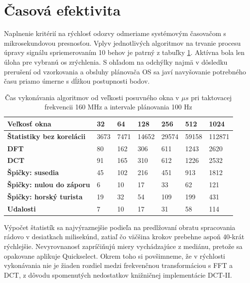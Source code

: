 \section{Časová efektivita}
Naplnenie kritérií na rýchlosť odozvy odmeriame systémovým časovačom s mikrosekundovou presnosťou.
Vplyv jednotlivých algoritmov na trvanie procesu úpravy signálu spriemerovaním 10 behov
je patrný z tabuľky \ref{tab:algorithm-execution}. Aktívna bola len úloha pre vybranú os zrýchlenia. S ohľadom na odchýlky
najmä v dôsledku prerušení od vzorkovania a obsluhy plánovača OS sa javí navyšovanie potrebného času priamo úmerne
s dĺžkou postupnosti bodov.
\begin{table}[h]
\def\arraystretch{1.25}
\centering
\begin{tabular}{|l|l|l|l|l|l|l|}
\hline
\textbf{Veľkosť okna}         & \textbf{32} & \textbf{64} & \textbf{128} & \textbf{256} & \textbf{512} & \textbf{1024} \\ \hline
\textbf{Štatistiky bez korelácii}& 3673        & 7471        & 14652        & 29574        & 59158        & 112871        \\ \hline
\textbf{DFT}                     & 80          & 162         & 306          & 611          & 1243         & 2620          \\ \hline
\textbf{DCT}                     & 91          & 165         & 310          & 612          & 1226         & 2532          \\ \hline
\textbf{Špičky: susedia}         & 45          & 102         & 216          & 451          & 913          & 1812          \\ \hline
\textbf{Špičky: nulou do záporu} & 6           & 10          & 17           & 33           & 62           & 121           \\ \hline
\textbf{Špičky: horský turista}  & 19          & 32          & 54           & 109          & 199          & 431           \\ \hline
\textbf{Udalosti}                & 7           & 10          & 17           & 31           & 58           & 114           \\ \hline
\end{tabular}
\caption{Čas vykonávania algoritmov od veľkosti posuvného okna v $\mu s$ pri taktovacej frekvencii 160 MHz a intervale
plánovania 100 Hz}
\label{tab:algorithm-execution}
\end{table}

Výpočet štatistík sa najvýraznejšie podieľa na predlžovaní obratu spracovania rádovo v desiatkach
milisekúnd, zatiaľ čo väčšina krokov prebehne aspoň 40-krát rýchlejšie. Nevyrovnanosť zapríčiňujú miery vychádzajúce z
mediánu, pretože sa opakovane aplikuje Quickselect. Okrem toho si povšimneme, že v rýchlosti vykonávania nie je
žiaden rozdiel medzi frekvenčnou transformáciou s FFT a DCT, z dôvodu spomenutých nedostatkov knižničnej implementácie DCT-II.

